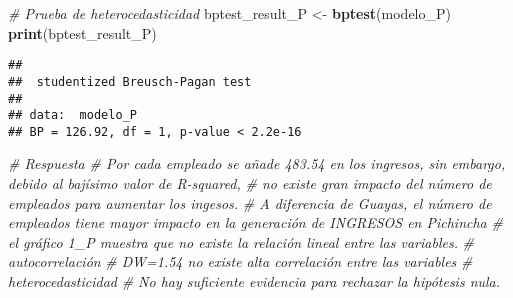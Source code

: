 \documentclass[
]{article}
\newenvironment{Shaded}{\begin{snugshade}}{\end{snugshade}}
\newcommand{\CommentTok}[1]{\textcolor[rgb]{0.56,0.35,0.01}{\textit{#1}}}
\newcommand{\FunctionTok}[1]{\textcolor[rgb]{0.13,0.29,0.53}{\textbf{#1}}}
\newcommand{\NormalTok}[1]{#1}
\newcommand{\OtherTok}[1]{\textcolor[rgb]{0.56,0.35,0.01}{#1}}
\begin{document}
\begin{Shaded}
\begin{Highlighting}[]
\CommentTok{\# Prueba de heterocedasticidad}
\NormalTok{bptest\_result\_P }\OtherTok{\textless{}{-}} \FunctionTok{bptest}\NormalTok{(modelo\_P)}
\FunctionTok{print}\NormalTok{(bptest\_result\_P)}
\end{Highlighting}
\end{Shaded}

\begin{verbatim}
## 
##  studentized Breusch-Pagan test
## 
## data:  modelo_P
## BP = 126.92, df = 1, p-value < 2.2e-16
\end{verbatim}

\begin{Shaded}
\begin{Highlighting}[]
\CommentTok{\# Respuesta}
\CommentTok{\# Por cada empleado se añade 483.54 en los ingresos, sin embargo, debido al bajísimo valor de R{-}squared, }
\CommentTok{\# no existe gran impacto del número de empleados para aumentar los ingesos.}
\CommentTok{\# A diferencia de Guayas, el número de empleados tiene mayor impacto en la generación de INGRESOS en Pichincha}
\CommentTok{\# el gráfico 1\_P muestra que no existe la relación lineal entre las variables.}
\CommentTok{\# autocorrelación}
\CommentTok{\# DW=1.54 no existe alta correlación entre las variables}
\CommentTok{\# heterocedasticidad}
\CommentTok{\# No hay suficiente evidencia para rechazar la hipótesis nula.}
\end{Highlighting}
\end{Shaded}
\end{document}
